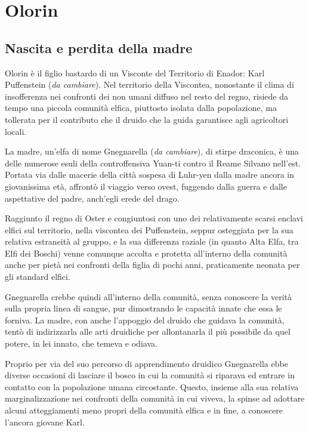 \section{Olorin}

\subsection{Nascita e perdita della madre}

Olorin è il figlio bastardo di un Visconte del Territorio di Enador: Karl Puffenstein (\textit{da cambiare}).  %
Nel territorio della Viscontea, nonostante il clima di insofferenza nei confronti dei non umani diffuso nel resto del regno, risiede da tempo una piccola comunità elfica, piuttosto isolata dalla popolazione, ma tollerata per il contributo che il druido che la guida garantisce agli agricoltori locali.

La madre, un'elfa di nome Gnegnarella (\textit{da cambiare}), di stirpe draconica, è una delle numerose esuli della controffensiva Yuan-ti contro il Reame Silvano nell'est. Portata via dalle macerie della città sospesa di Luhr-yen dalla madre ancora in giovanissima età, affrontò il viaggio verso ovest, fuggendo dalla guerra e dalle aspettative del padre, anch'egli erede del drago.

Raggiunto il regno di Oster e congiuntosi con uno dei relativamente scarsi enclavi elfici sul territorio, nella viscontea dei Puffenstein, seppur osteggiata per la sua relativa estraneità al gruppo, e la sua differenza raziale (in quanto Alta Elfa, tra Elfi dei Boschi) venne comunque accolta e protetta all'interno della comunità anche per pietà nei confronti della figlia di pochi anni, praticamente neonata per gli standard elfici.

Gnegnarella crebbe quindi all'interno della comunità, senza conoscere la verità sulla propria linea di sangue, pur dimostrando le capacità innate che essa le forniva. La madre, con anche l'appoggio del druido che guidava la comunità, tentò di indirizzarla alle arti druidiche per allontanarla il più possibile da quel potere, in lei innato, che temeva e odiava.

Proprio per via del suo percorso di apprendimento druidico Gnegnarella ebbe diverse occasioni di lasciare il bosco in cui la comunità si riparava ed entrare in contatto con la popolazione umana circostante. Questo, insieme alla sua relativa marginalizzazione nei confronti della comunità in cui viveva, la spinse ad adottare alcuni atteggiamenti meno propri della comunità elfica e in fine, a conoscere l'ancora giovane Karl.

